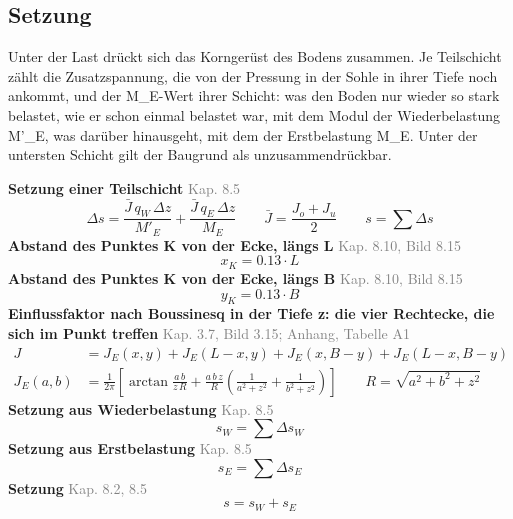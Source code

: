 \documentclass[11pt,a4paper]{article}
\newcommand{\normref}[1]{{\small\textcolor{gray}{#1}}}
\begin{document}
\subsection{Setzung}
Unter der Last drückt sich das Korngerüst des Bodens zusammen. Je Teilschicht zählt die Zusatzspannung, die von der Pressung in der Sohle in ihrer Tiefe noch ankommt, und der M\_E-Wert ihrer Schicht: was den Boden nur wieder so stark belastet, wie er schon einmal belastet war, mit dem Modul der Wiederbelastung M'\_E, was darüber hinausgeht, mit dem der Erstbelastung M\_E. Unter der untersten Schicht gilt der Baugrund als unzusammendrückbar.

\noindent\textbf{Setzung einer Teilschicht} \hfill \normref{Kap. 8.5}
\begin{equation*}
\Delta s = \frac{\bar{J} \, q_W \, \Delta z}{M'_E} + \frac{\bar{J} \, q_E \, \Delta z}{M_E} \qquad \bar{J} = \frac{J_o + J_u}{2} \qquad s = \sum \Delta s
\end{equation*}
\noindent\textbf{Abstand des Punktes K von der Ecke, längs L} \hfill \normref{Kap. 8.10, Bild 8.15}
\begin{equation*}
x_K = 0.13 \cdot L
\end{equation*}
\noindent\textbf{Abstand des Punktes K von der Ecke, längs B} \hfill \normref{Kap. 8.10, Bild 8.15}
\begin{equation*}
y_K = 0.13 \cdot B
\end{equation*}
\noindent\textbf{Einflussfaktor nach Boussinesq in der Tiefe z: die vier Rechtecke, die sich im Punkt treffen} \hfill \normref{Kap. 3.7, Bild 3.15; Anhang, Tabelle A1}
\begin{equation*}
\begin{aligned} J &= J_E(x, y) + J_E(L - x, y) + J_E(x, B - y) + J_E(L - x, B - y) \\ J_E(a, b) &= \frac{1}{2\pi} \left[\arctan\frac{a \, b}{z \, R} + \frac{a \, b \, z}{R} \left(\frac{1}{a^2 + z^2} + \frac{1}{b^2 + z^2}\right)\right] \qquad R = \sqrt{a^2 + b^2 + z^2} \end{aligned}
\end{equation*}
\noindent\textbf{Setzung aus Wiederbelastung} \hfill \normref{Kap. 8.5}
\begin{equation*}
s_W = \sum \Delta s_W
\end{equation*}
\noindent\textbf{Setzung aus Erstbelastung} \hfill \normref{Kap. 8.5}
\begin{equation*}
s_E = \sum \Delta s_E
\end{equation*}
\noindent\textbf{Setzung} \hfill \normref{Kap. 8.2, 8.5}
\begin{equation*}
s = s_W + s_E
\end{equation*}
\end{document}
